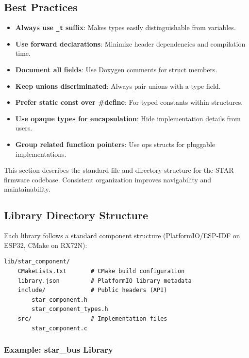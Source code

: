 \subsection{Best Practices}

\begin{itemize}
    \item \textbf{Always use \texttt{\_t} suffix}: Makes types easily distinguishable from variables.
    \item \textbf{Use forward declarations}: Minimize header dependencies and compilation time.
    \item \textbf{Document all fields}: Use Doxygen comments for struct members.
    \item \textbf{Keep unions discriminated}: Always pair unions with a type field.
    \item \textbf{Prefer static const over \#define}: For typed constants within structures.
    \item \textbf{Use opaque types for encapsulation}: Hide implementation details from users.
    \item \textbf{Group related function pointers}: Use ops structs for pluggable implementations.
\end{itemize}



This section describes the standard file and directory structure for the STAR firmware codebase. Consistent organization improves navigability and maintainability.

\subsection{Library Directory Structure}

Each library follows a standard component structure (PlatformIO/ESP-IDF on ESP32, CMake on RX72N):

\begin{verbatim}
lib/star_component/
    CMakeLists.txt       # CMake build configuration
    library.json         # PlatformIO library metadata
    include/             # Public headers (API)
        star_component.h
        star_component_types.h
    src/                 # Implementation files
        star_component.c
\end{verbatim}

\subsubsection{Example:
      star\_bus Library}

